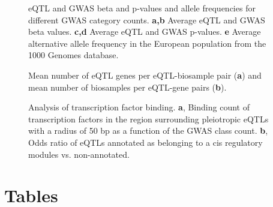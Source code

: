 \begin{backmatter}
%
%

    \begin{figure}[!ht]
        \caption{eQTL and GWAS beta and p-values and allele frequencies for different GWAS category counts.
        \textbf{a,b} Average eQTL and GWAS beta values.
        \textbf{c,d} Average eQTL and GWAS p-values.
        \textbf{e} Average alternative allele frequency in the European population from the 1000 Genomes database.
        }
        \label{fig:4}
    \end{figure}

%
%

    \begin{figure}[!ht]
        \caption{Mean number of eQTL genes per eQTL-biosample pair (\textbf{a}) and mean number of biosamples per eQTL-gene pairs (\textbf{b}).} \label{fig:gwas_egene_etisue_per_variant}
    \end{figure}

%
%

    \begin{figure}[!ht]
        \caption{Analysis of transcription factor binding.
        \textbf{a}, Binding count of transcription factors in the region surrounding pleiotropic eQTLs with a radius of 50 bp as a function of the GWAS class count.
        \textbf{b}, Odds ratio of eQTLs annotated as belonging to a cis regulatory modules vs. non-annotated.}
        \label{fig:freq_tf_per_variant}
    \end{figure}


    \section*{Tables}


\end{backmatter}
